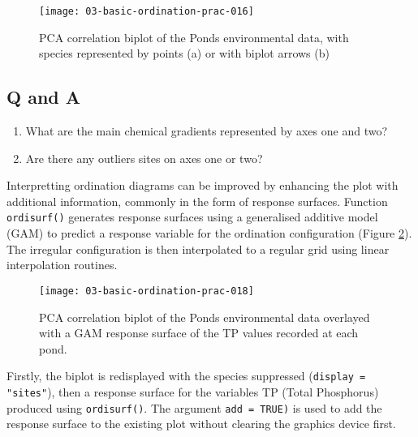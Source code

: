 \documentclass[a4paper,10pt]{article}
\begin{document}
\begin{figure}[t]
\begin{center}
\texttt{[image: 03-basic-ordination-prac-016]}
\caption{\label{pca_biplot}PCA correlation biplot of the Ponds environmental data, with species represented by points (a) or with biplot arrows (b)}
\end{center}
\end{figure}

\subsection*{Q and A}
\begin{enumerate}
\item What are the main chemical gradients represented by axes one and two?
\item Are there any outliers sites on axes one or two?
\end{enumerate}

Interpretting ordination diagrams can be improved by enhancing the plot with additional information, commonly in the form of response surfaces. Function \texttt{ordisurf()} generates response surfaces using a generalised additive model (GAM) to predict a response variable for the ordination configuration (Figure \ref{pca_surface}). The irregular configuration is then interpolated to a regular grid using linear interpolation routines.

\begin{Schunk}
\end{Schunk}

\begin{figure}[t]
\begin{center}
\texttt{[image: 03-basic-ordination-prac-018]}
\caption{\label{pca_surface}PCA correlation biplot of the Ponds environmental data overlayed with a GAM response surface of the TP values recorded at each pond.}
\end{center}
\end{figure}

Firstly, the biplot is redisplayed with the species suppressed (\texttt{display = "sites"}), then a response surface for the variables TP (Total Phosphorus) produced using \texttt{ordisurf()}. The argument \texttt{add = TRUE)} is used to add the response surface to the existing plot without clearing the graphics device first.
\end{document}
